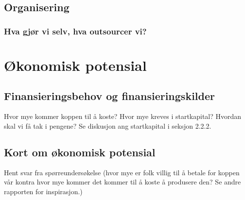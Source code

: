 \subsection{Organisering}



\subsubsection{Hva gjør vi selv, hva outsourcer vi?}

\section{Økonomisk potensial}

\subsection{Finansieringsbehov og finansieringskilder}
Hvor mye kommer koppen til å koste? Hvor mye kreves i startkapital? Hvordan skal vi få tak i pengene? Se diskusjon ang startkapital i seksjon 2.2.2.
\subsection{Kort om økonomisk potensial}
Hent svar fra spørreundersøkelse (hvor mye er folk villig til å betale for koppen vår kontra hvor mye kommer det kommer til å koste å produsere den? Se andre rapporten for inspirasjon.)


